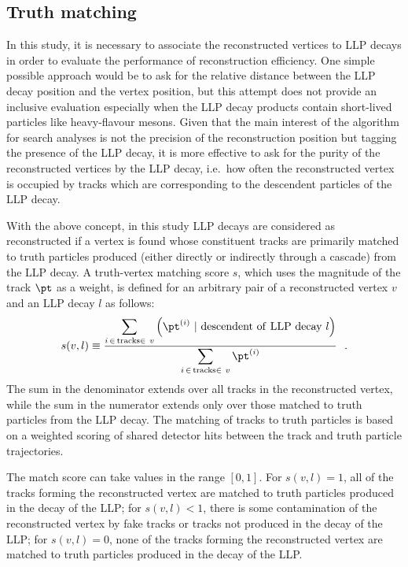 \documentclass[PUB,UKenglish, texlive=2018]{\ATLASLATEXPATH atlasdoc}
\begin{document}
\subsection{Truth matching \label{sec:truthMatching} }

In this study, it is necessary to associate the reconstructed vertices to LLP decays in order to evaluate the performance of reconstruction efficiency. 
One simple possible approach would be to ask for the relative distance between the LLP decay position and the vertex position, 
but this attempt does not provide an inclusive evaluation especially when the LLP decay products contain short-lived particles like heavy-flavour mesons. 
Given that the main interest of the algorithm for search analyses is not the precision of the reconstruction position but tagging the presence of the LLP decay,
it is more effective to ask for the purity of the reconstructed vertices by the LLP decay, i.e.~how often the reconstructed vertex is occupied by tracks which are corresponding to the descendent particles of the LLP decay.

With the above concept, in this study LLP decays are considered as reconstructed if a vertex is found whose constituent tracks are primarily matched to truth particles produced (either directly or indirectly through a cascade) from the LLP decay. 
A truth-vertex matching score $s$, which uses the magnitude of the track $\pt$ as a weight, is defined for an arbitrary pair of a reconstructed vertex $v$ and an LLP decay $l$ as follows:
\begin{equation}
\label{eq:matchScore}
s(v,l) \equiv \frac{\displaystyle \sum_{i\,\in\,{\rm tracks}\in~v} \left(\pt^{(i)}~|~{\rm descendent~of~LLP~decay}~l\right)}{\displaystyle \sum_{i\,\in\,{\rm tracks}\in~v}\pt^{(i)}}~~.
\end{equation}
The sum in the denominator extends over all tracks in the reconstructed vertex, while the sum in the numerator extends only over those matched to truth particles from the LLP decay.  
The matching of tracks to truth particles is based on a weighted scoring of shared detector hits between the track and truth particle trajectories.

The match score can take values in the range $[0,1]$.  For $s(v,l)=1$, all of the tracks forming the reconstructed vertex are matched to truth particles produced in the decay of the LLP; for $s(v,l)<1$, there is some contamination of the reconstructed vertex by fake tracks or tracks not produced in the decay of the LLP; for $s(v,l)=0$, none of the tracks forming the reconstructed vertex are matched to truth particles produced in the decay of the LLP. 
\end{document}
